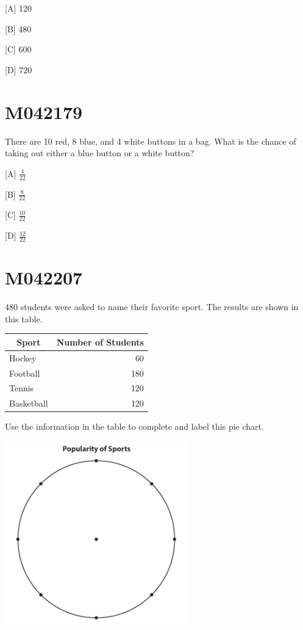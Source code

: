 \documentclass[12pt]{article}
\begin{document}
[A] 120

[B] 480

[C] 600

[D] 720

\newpage
\section*{M042179}

There are 10 red, 8 blue, and 4 white buttons in a bag. What is the chance of taking out either a blue button or a white button?


[A] $\frac{4}{22}$ 

[B] $\frac{8}{22}$ 

[C] $\frac{10}{22}$ 

[D] $\frac{12}{22}$


\newpage
\section*{M042207}

480 students were asked to name their favorite sport. The results are shown in this table.


\begin{tabular}{|l|r|}
\hline
\multicolumn{1}{|c|}{Sport} & Number of Students \\
\hline
Hockey & 60 \\
\hline
Football & 180 \\
\hline
Tennis & 120 \\
\hline
Basketball & 120 \\
\hline
\end{tabular}


Use the information in the table to complete and label this pie chart.

\includegraphics[max width=0.6\textwidth]{2024_02_20_828ebc9d68bcc1fbb223g-83}
\end{document}
